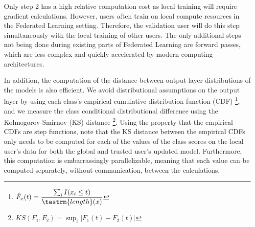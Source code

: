 \documentclass{article} %
\begin{document}
Only step 2 has a high relative computation cost as local training will require gradient calculations. However, users often train on local compute resources in the Federated Learning setting. Therefore, the validation user will do this step simultaneously with the local training of other users. The only additional steps not being done during existing parts of Federated Learning are forward passes, which are less complex and quickly accelerated by modern computing architectures.

In addition, the computation of the distance between output layer distributions of the models is also efficient. We avoid distributional assumptions on the output layer by using each class's empirical cumulative distribution function (CDF) \footnote{$\hat F_x(t) = \dfrac{\sum_i I(x_i \leq t)}{\testrm{length}(x)}$}, and we measure the class conditional distributional difference using the Kolmogorov-Smirnov (KS) distance \footnote{$KS(F_1, F_2) = \sup_t | F_1(t) - F_2(t) |$}. Using the property that the empirical CDFs are step functions, note that the KS distance between the empirical CDFs only needs to be computed for each of the values of the class scores on the local user's data for both the global and trusted user's updated model. Furthermore, this computation is embarrassingly parallelizable, meaning that each value can be computed separately, without communication, between the calculations. 
\end{document}
